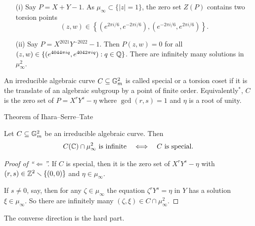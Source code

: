 \documentclass{beamer}
\begin{document}
\begin{frame}
  \begin{example}
    \begin{itemize}
    \item [(i)] Say $P = X+Y-1$. As $\mu_\infty \subset \{|z|=1\}$, 
      the zero set $Z(P)$ contains two torsion points
      $$
      (z,w) \in \left\{ (e^{2\pi i/6},e^{-2\pi i/6}),(e^{-2\pi
          i/6},e^{2\pi i/6})\right\}.
      $$

    \item[(ii)] Say
      $P=X^{2021}Y^{-2022}-1$. Then
      $P(z,w)=0$ for all $(z,w)\in \{(e^{4044\pi iq},e^{4042\pi i
        q}) : q\in{\mathbb{Q}}\}$.
      There are infinitely many solutions in $\mu_\infty^2$.
    \end{itemize}
  \end{example}

  \begin{definition}
    An irreducible algebraic curve $C\subseteq {\mathbb{G}}_m^2$
    is called \alert{special} or a \alert{torsion coset} if it is the translate of an algebraic subgroup by
    a point of finite order. Equivalently${}^*$,
    $C$  is the zero set of    $P=X^rY^s-\eta$ where
    $\gcd(r,s)=1$ 
    and $\eta$ is a root of unity. 
  \end{definition}
\end{frame}

\begin{frame}{Theorem of Ihara--Serre--Tate}
  \begin{theorem}
    Let $C\subseteq {\mathbb{G}}_m^2$ be an irreducible algebraic curve.
    Then
    \begin{equation*}
      C({\mathbb{C}}) \cap \mu_\infty^2\text{ is infinite}\quad\Longleftrightarrow\quad \text{$C$ is special}. 
    \end{equation*}
  \end{theorem}

  \begin{proof}[Proof of ``$\Longleftarrow$'']
    If $C$ is special, then it is the zero set of $X^rY^s-\eta$ with
    $(r,s)\in{\mathbb{Z}}^2\smallsetminus\{(0,0)\}$ and $\eta\in \mu_\infty$.

    If $s\not=0$, say, then for any $\zeta\in\mu_\infty$ the equation
    $\zeta^r Y^s =\eta$ in $Y$ has a solution $\xi\in\mu_\infty$.
    So there are infinitely many $(\zeta,\xi)\in
    C\cap\mu_\infty^2$.     
  \end{proof}

  The converse direction is the hard part. 
\end{frame}
\end{document}
